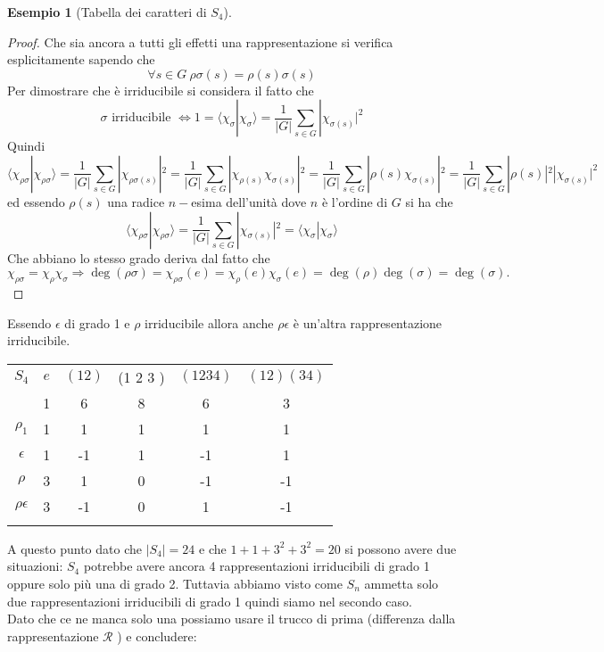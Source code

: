 \documentclass[11pt]{article}
\theoremstyle{plain}
\theoremstyle{definition}
\newtheorem{exmp}{Esempio}[section]
\theoremstyle{remark}
\begin{document}
\begin{exmp}[Tabella dei caratteri di $S_4$]
\begin{proof}
Che sia ancora a tutti gli effetti una rappresentazione si verifica esplicitamente sapendo che
\[
\forall s\in G\ \rho\sigma(s)=\rho(s)\sigma(s)
\]
Per dimostrare che è irriducibile si considera il fatto che
\[
\sigma \text{ irriducibile } \Leftrightarrow 1=\langle\chi_{\sigma}|\chi_{\sigma}\rangle=\frac{1}{|G|}\sum_{s\in G}|\chi_{\sigma(s)}|^2
\]
Quindi
\[
\langle \chi_{\rho\sigma}|\chi_{\rho\sigma}\rangle=\frac{1}{|G|}\sum_{s\in G}|\chi_{\rho\sigma(s)}|^2=\frac{1}{|G|}\sum_{s\in G}|\chi_{\rho(s)}\chi_{\sigma(s)}|^2=\frac{1}{|G|}\sum_{s\in G}|\rho(s)\chi_{\sigma(s)}|^2=\frac{1}{|G|}\sum_{s\in G}|\rho(s)|^2|\chi_{\sigma(s)}|^2
\]
ed essendo $\rho(s)$ una radice $n-$esima dell'unità dove $n$ è l'ordine di $G$ si ha che 
\[
\langle \chi_{\rho\sigma}|\chi_{\rho\sigma}\rangle=\frac{1}{|G|}\sum_{s\in G}
|\chi_{\sigma(s)}|^2=\langle \chi_{\sigma}|\chi_{\sigma}\rangle
\]
Che abbiano lo stesso grado deriva dal fatto che
\[
\chi_{\rho\sigma}=\chi_{\rho}\chi_{\sigma}\Rightarrow \deg(\rho\sigma)=\chi_{\rho\sigma}(e)=\chi_{\rho}(e)\chi_{\sigma}(e)=\deg(\rho)\deg(\sigma)=\deg(\sigma).
\]
\end{proof}
Essendo $\epsilon$ di grado 1 e $\rho$ irriducibile allora anche $\rho\epsilon$ è un'altra rappresentazione irriducibile.
\begin{table}[!ht]
\centering
\begin{tabular}{|c|c|c|c|c|c|}
\hline
$S_4$  & $e$ & $(1 2)$ & (1 2 3 ) & $(1 2 3 4)$ & $(1 2)(3 4)$ \\
 & 1 & 6 & 8 & 6 & 3 \\
\hline
 $\rho_1$ & 1 & 1  & 1 & 1 & 1\\
\hline
$\epsilon$ & 1  & -1 & 1 & -1 & 1 \\
\hline
$\rho$& 3 & 1 & 0 & -1 & -1\\
\hline
$\rho\epsilon$& 3 & -1 & 0 & 1 & -1\\
\hline
& &  & & & \\
\hline
\end{tabular}
\end{table}
A questo punto dato che $|S_4|=24$ e che $1+1+3^2+3^2=20$ si possono avere due situazioni: $S_4$ potrebbe avere ancora 4 rappresentazioni irriducibili di grado 1 oppure solo più una di grado 2. Tuttavia abbiamo visto come $S_n$ ammetta solo due rappresentazioni irriducibili di grado 1 quindi siamo nel secondo caso.\\
Dato che ce ne manca solo una possiamo usare il trucco di prima (differenza dalla rappresentazione $\mathcal{R}$ ) e concludere:


\end{exmp}
\end{document}
